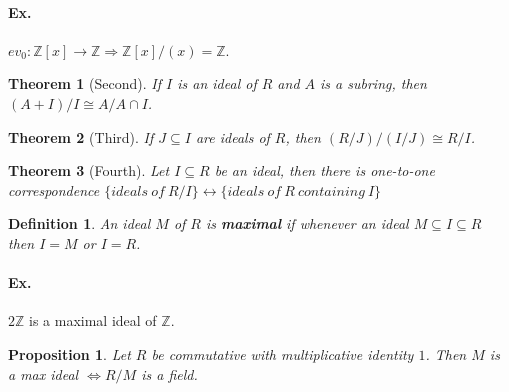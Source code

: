 \documentclass[12pt]{article}
\newtheorem{definition}{Definition}[subsection]
\newtheorem{theorem}{Theorem}[subsection]
\newtheorem{proposition}{Proposition}[subsection]
\begin{document}
			\paragraph{Ex.} $ev_0: \mathbb{Z}[x] \rightarrow \mathbb{Z} \Rightarrow \mathbb{Z}[x]/(x) = \mathbb{Z}$.
			
			\begin{theorem}[Second]
				If $I$ is an ideal of $R$ and $A$ is a subring, then $(A + I) / I \cong A / A \cap I$.
			\end{theorem}
			
			\begin{theorem}[Third]
				If $J \subseteq I$ are ideals of $R$, then $(R/J)/(I/J) \cong R/I$.
			\end{theorem}

			\begin{theorem}[Fourth]
				Let $I \subseteq R$ be an ideal, then there is one-to-one correspondence $\{ideals\ of\ R/I\} \leftrightarrow \{ideals\ of\ R\ containing\ I\}$ 
			\end{theorem}
			
			\begin{definition}
				An ideal $M$ of $R$ is \textbf{maximal} if whenever an ideal $M \subseteq I \subseteq R$ then $I = M$ or $I = R$.
			\end{definition}	
			
			\paragraph{Ex.} $2\mathbb{Z}$ is a maximal ideal of $\mathbb{Z}$.
			
			\begin{proposition}
				Let $R$ be commutative with multiplicative identity $1$. Then $M$ is a max ideal $\Leftrightarrow R / M$ is a field.
			\end{proposition}		
			
\end{document}

